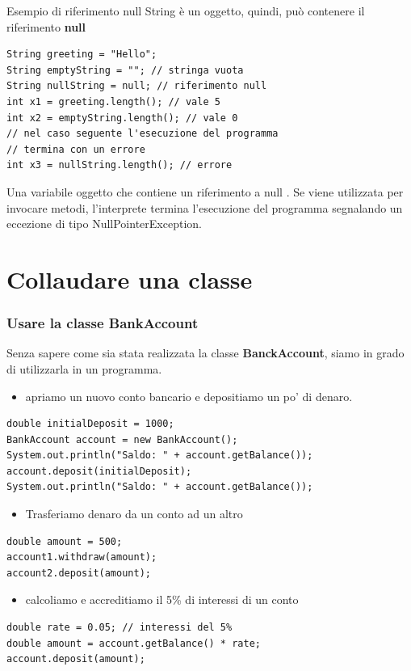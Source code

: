\begin{frame}[fragile]
\begin{block}{Esempio di riferimento null}
String è un oggetto, quindi, può contenere il riferimento \textbf{null}
\end{block}
\begin{lstlisting}
String greeting = "Hello";
String emptyString = ""; // stringa vuota 
String nullString = null; // riferimento null 
int x1 = greeting.length(); // vale 5
int x2 = emptyString.length(); // vale 0
// nel caso seguente l'esecuzione del programma
// termina con un errore
int x3 = nullString.length(); // errore
\end{lstlisting}
\begin{block}{}
Una variabile oggetto che contiene un riferimento a null \textbf{}.
Se viene utilizzata per invocare metodi, l'interprete termina l'esecuzione del programma segnalando un eccezione di tipo
\alert{NullPointerException}.
\end{block}
\end{frame}
\section*{Collaudare una classe}
\begin{frame}[fragile]
\frametitle{Usare la classe BankAccount}
\begin{block}{}
Senza sapere come sia stata realizzata la classe \textbf{BanckAccount}, siamo in grado di utilizzarla in un programma.
\begin{itemize}
\item apriamo un nuovo conto bancario e depositiamo un po' di denaro.
\end{itemize}
\end{block}
\begin{lstlisting}
double initialDeposit = 1000;
BankAccount account = new BankAccount();
System.out.println("Saldo: " + account.getBalance());
account.deposit(initialDeposit);
System.out.println("Saldo: " + account.getBalance());
\end{lstlisting}
\end{frame}

\begin{frame}[fragile]
\begin{itemize}
\item Trasferiamo denaro da un conto ad un altro
\end{itemize}
\begin{lstlisting}
double amount = 500;
account1.withdraw(amount);
account2.deposit(amount);
\end{lstlisting}
\begin{itemize}
\item calcoliamo e accreditiamo il 5\% di interessi di un conto
\end{itemize}
\begin{lstlisting}
double rate = 0.05; // interessi del 5%
double amount = account.getBalance() * rate;
account.deposit(amount);
\end{lstlisting}
\end{frame}

